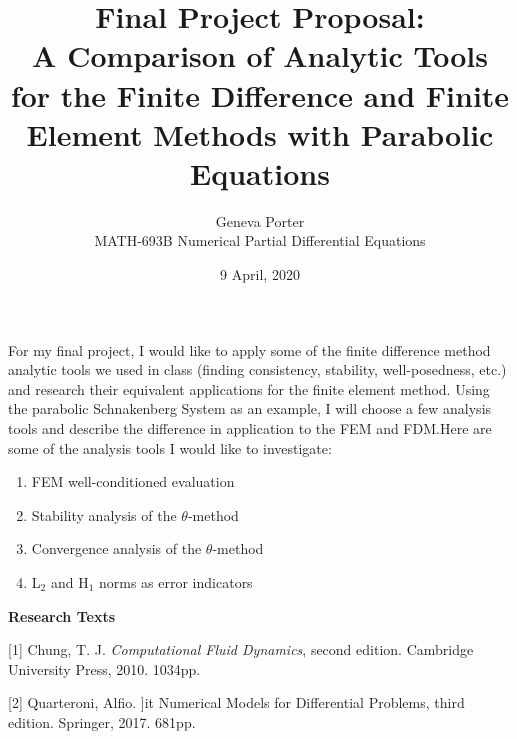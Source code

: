 \documentclass[12pt]{article}
\title{Final Project Proposal: \\ A Comparison of Analytic Tools for the Finite Difference and Finite Element Methods with Parabolic Equations}
\author{Geneva Porter\\ 
MATH-693B Numerical Partial Differential Equations\\}
\date{9 April, 2020}
\begin{document}
\maketitle

For my final project, I would like to apply some of the finite difference method analytic tools we used in class (finding consistency, stability, well-posedness, etc.) and research their equivalent applications for the finite element method. Using the parabolic Schnakenberg System as an example, I will choose a few analysis tools and describe the difference in application to the FEM and FDM.Here are some of the analysis tools I would like to investigate:

\begin{enumerate}
	\item FEM well-conditioned evaluation
	\item Stability analysis of the $\theta$-method
	\item Convergence analysis of the $\theta$-method
	\item L$_2$ and H$_1$ norms as error indicators
\end{enumerate}

\vfill

\textbf{Research Texts}

[1] Chung, T. J. {\it Computational Fluid Dynamics}, second edition. Cambridge University Press, 2010. 1034pp.

[2] Quarteroni, Alfio. {]it Numerical Models for Differential Problems}, third edition. Springer, 2017. 681pp.
\end{document}
